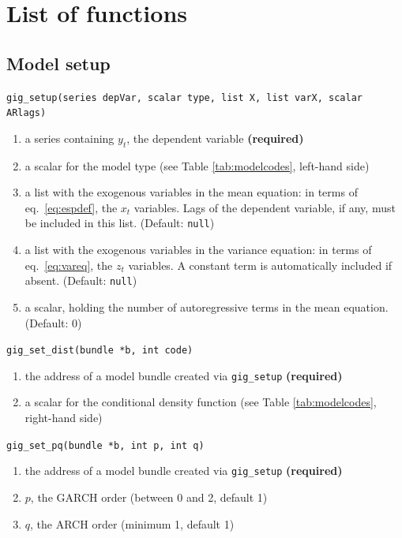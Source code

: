 \documentclass[a4paper,11pt]{article}
\newenvironment{funcdoc}[1]
{\noindent\hrulefill\newline\texttt{#1}\par\noindent\hrulefill\par\medskip\par}
{\bigskip}
\begin{document}


\appendix

\section{List of functions}
\label{sec:syntax}
\subsection{Model setup}
\label{sec:gig_setup}

\begin{funcdoc}{gig\_setup(series depVar, scalar type, list X, 
			  list varX, scalar ARlags)}
\begin{enumerate}
\item a series containing $y_t$, the dependent variable \textbf{(required)}
\item a scalar for the model type (see Table \ref{tab:modelcodes},
  left-hand side)
\item a list with the exogenous variables in the mean equation: in
  terms of eq.~\eqref{eq:espdef}, the $x_t$ variables. Lags of the
  dependent variable, if any, must be included in this list. (Default:
  \texttt{null})
\item a list with the exogenous variables in the variance equation: in
  terms of eq.~\eqref{eq:vareq}, the $z_t$ variables. A constant term
  is automatically included if absent. (Default: \texttt{null})
\item a scalar, holding the number of autoregressive terms in the mean
  equation. (Default: 0)
\end{enumerate}
\end{funcdoc}

\begin{funcdoc}{gig\_set\_dist(bundle *b, int code)}
\begin{enumerate}
\item the address of a model bundle created via \texttt{gig\_setup}
  \textbf{(required)}
\item a scalar for the conditional density function (see Table \ref{tab:modelcodes},
  right-hand side)
\end{enumerate}
\end{funcdoc}

\begin{funcdoc}{gig\_set\_pq(bundle *b, int p, int q)}
\begin{enumerate}
\item the address of a model bundle created via \texttt{gig\_setup}
  \textbf{(required)}
\item  $p$, the GARCH order (between 0 and 2, default 1)
\item  $q$, the ARCH order (minimum 1, default 1)
\end{enumerate}
\end{funcdoc}
\end{document}
